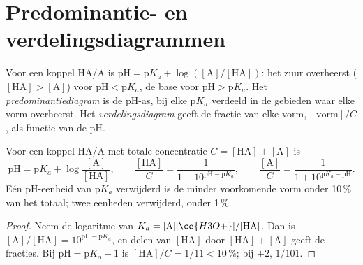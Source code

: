 \section{Predominantie- en verdelingsdiagrammen}

\begin{definition}\label{def:b1:predominant-reaction:predominance}
Voor een koppel HA/A is $\mathrm{pH} = \mathrm{p}K_a + \log([\mathrm{A}]/[\mathrm{HA}])$:
het zuur overheerst ($[\mathrm{HA}] > [\mathrm{A}]$) voor
$\mathrm{pH} < \mathrm{p}K_a$, de base voor $\mathrm{pH} > \mathrm{p}K_a$.
Het \emph{predominantiediagram} is de pH-as,
bij elke $\mathrm{p}K_a$ verdeeld in de gebieden waar elke vorm
overheerst. Het \emph{verdelingsdiagram} geeft de
fractie van elke vorm, $[\text{vorm}]/C$, als functie van de pH.
\end{definition}

\begin{proposition}\label{prop:b1:predominant-reaction:henderson}
Voor een koppel HA/A met totale concentratie $C = [\mathrm{HA}] + [\mathrm{A}]$
is
\[
  \mathrm{pH} = \mathrm{p}K_a + \log\frac{[\mathrm{A}]}{[\mathrm{HA}]}, \qquad
  \frac{[\mathrm{HA}]}{C} = \frac{1}{1 + 10^{\mathrm{pH} - \mathrm{p}K_a}}, \qquad
  \frac{[\mathrm{A}]}{C} = \frac{1}{1 + 10^{\mathrm{p}K_a - \mathrm{pH}}} .
\]
Eén pH-eenheid van $\mathrm{p}K_a$ verwijderd is de minder voorkomende
vorm onder 10\,\% van het totaal; twee eenheden verwijderd, onder 1\,\%.
\end{proposition}

\begin{proof}
Neem de logaritme van $K_a = [\mathrm{A}][\ce{H3O+}]/[\mathrm{HA}]$. Dan
is $[\mathrm{A}]/[\mathrm{HA}] = 10^{\mathrm{pH}-\mathrm{p}K_a}$, en delen
van $[\mathrm{HA}]$ door $[\mathrm{HA}] + [\mathrm{A}]$ geeft de fracties.
Bij $\mathrm{pH} = \mathrm{p}K_a + 1$ is $[\mathrm{HA}]/C = 1/11 < 10\,\%$;
bij $+2$, $1/101$.
\end{proof}

